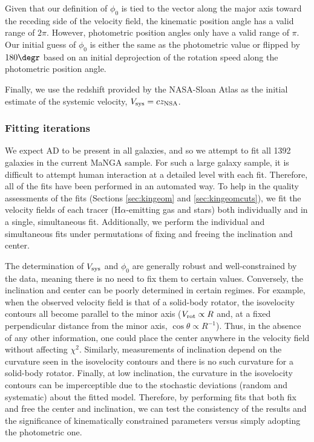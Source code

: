 \documentclass[apj,iop,revtex4,numberedappendix]{emulateapj}
\newcommand{\halpha}{H$\alpha$}
\begin{document}
Given that our definition of $\phi_0$ is tied to the vector along the
major axis toward the receding side of the velocity field, the kinematic
position angle has a valid range of $2\pi$.  However, photometric
position angles only have a valid range of $\pi$.  Our initial guess of
$\phi_0$ is either the same as the photometric value or flipped by
$180\degr$ based on an initial deprojection of the rotation speed along
the photometric position angle.

Finally, we use the redshift provided by the NASA-Sloan Atlas as the
initial estimate of the systemic velocity, $V_{\rm sys} = c z_{\rm
NSA}$.

\subsubsection{Fitting iterations}
\label{sec:vfiter}

We expect AD to be present in all galaxies, and so we
attempt to fit all 1392 galaxies in the current MaNGA sample.  For such
a large galaxy sample, it is difficult to attempt human interaction at a
detailed level with each fit.  Therefore, all of the fits have been
performed in an automated way.  To help in the quality assessments of
the fits (Sections \ref{sec:kingeom} and \ref{sec:kingeomcuts}), we fit
the velocity fields of each tracer (\halpha-emitting gas and stars) both
individually and in a single, simultaneous fit.  Additionally, we
perform the individual and simultaneous fits under permutations of
fixing and freeing the inclination and center.

The determination of $V_{\rm sys}$ and $\phi_0$ are generally robust and
well-constrained by the data, meaning there is no need to fix them to
certain values.  Conversely, the inclination and center can be poorly
determined in certain regimes.  For example, when the observed velocity
field is that of a solid-body rotator, the isovelocity contours all
become parallel to the minor axis ($V_{\rm rot} \propto R$ and, at a
fixed perpendicular distance from the minor axis, $\cos\theta \propto
R^{-1}$).  Thus, in the absence of any other information, one could
place the center anywhere in the velocity field without affecting
$\chi^2$.  Similarly, measurements of inclination depend on the
curvature seen in the isovelocity contours and there is no such
curvature for a solid-body rotator.  Finally, at low inclination, the
curvature in the isovelocity contours can be imperceptible due to the
stochastic deviations (random and systematic) about the fitted model.
Therefore, by performing fits that both fix and free the center and
inclination, we can test the consistency of the results and the
significance of kinematically constrained parameters versus simply
adopting the photometric one.
\end{document}
